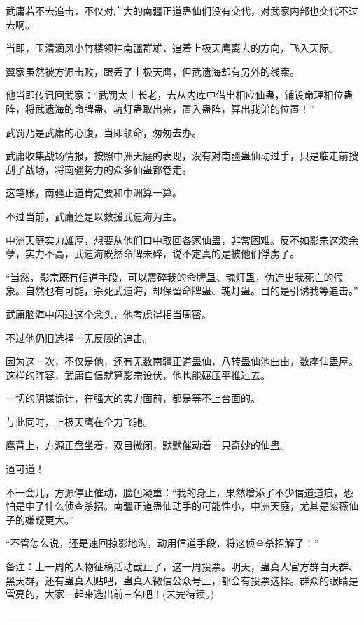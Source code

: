 \begin{this_body}
武庸若不去追击，不仅对广大的南疆正道蛊仙们没有交代，对武家内部也交代不过去啊。

当即，玉清滴风小竹楼领袖南疆群雄，追着上极天鹰离去的方向，飞入天际。

翼家虽然被方源击败，跟丢了上极天鹰，但武遗海却有另外的线索。

他当即传讯回武家：“武罚太上长老，去从内库中借出相应仙蛊，铺设命理相位蛊阵，将武遗海的命牌蛊、魂灯蛊取出来，置入蛊阵，算出我弟的位置！”

武罚乃是武庸的心腹，当即领命，匆匆去办。

武庸收集战场情报，按照中洲天庭的表现，没有对南疆蛊仙动过手，只是临走前搜刮了战场，将南疆势力的众多仙蛊都卷走。

这笔账，南疆正道肯定要和中洲算一算。

不过当前，武庸还是以救援武遗海为主。

中洲天庭实力雄厚，想要从他们口中取回各家仙蛊，非常困难。反不如影宗这波余孽，实力不高，武遗海既然命牌未碎，说不定真的是被他们俘虏了。

“当然，影宗既有信道手段，可以震碎我的命牌蛊、魂灯蛊，伪造出我死亡的假象。自然也有可能，杀死武遗海，却保留命牌蛊、魂灯蛊。目的是引诱我等追击。”

武庸脑海中闪过这个念头，他考虑得相当周密。

不过他仍旧选择一无反顾的追击。

因为这一次，不仅是他，还有无数南疆正道蛊仙，八转蛊仙池曲由，数座仙蛊屋。这样的阵容，武庸自信就算影宗设伏，他也能碾压平推过去。

一切的阴谋诡计，在强大的实力面前，都是等不上台面的。

与此同时，上极天鹰在全力飞驰。

鹰背上，方源正盘坐着，双目微闭，默默催动着一只奇妙的仙蛊。

道可道！

不一会儿，方源停止催动，脸色凝重：“我的身上，果然增添了不少信道道痕，恐怕是中了什么侦查杀招。南疆正道蛊仙动手的可能性小，中洲天庭，尤其是紫薇仙子的嫌疑更大。”

“不管怎么说，还是速回掠影地沟，动用信道手段，将这侦查杀招解了！”

备注：上一周的人物征稿活动截止了，这一周投票。明天，蛊真人官方群白天群、黑天群，还有蛊真人贴吧，蛊真人微信公众号上，都会有投票选择。群众的眼睛是雪亮的，大家一起来选出前三名吧！(未完待续。)

------------

\end{this_body}

